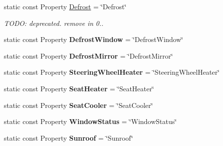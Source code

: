 \begin{DoxyCompactItemize}
\item 
\hypertarget{classVehicleProperty_a1f1ade6fb94a977e8dbc31b3a90b1cc3}{static const Property \hyperlink{classVehicleProperty_a1f1ade6fb94a977e8dbc31b3a90b1cc3}{Defrost} = \char`\"{}Defrost\char`\"{}}\label{classVehicleProperty_a1f1ade6fb94a977e8dbc31b3a90b1cc3}

\begin{DoxyCompactList}\small\item\em T\+O\+D\+O\+: deprecated. remove in 0.. \end{DoxyCompactList}\item 
\hypertarget{classVehicleProperty_a09d9a372040ca6ab43bb77e037fe0c26}{static const Property {\bfseries Defrost\+Window} = \char`\"{}Defrost\+Window\char`\"{}}\label{classVehicleProperty_a09d9a372040ca6ab43bb77e037fe0c26}

\item 
\hypertarget{classVehicleProperty_a08afe7a9d7dec0fcf7946a7d0715f27a}{static const Property {\bfseries Defrost\+Mirror} = \char`\"{}Defrost\+Mirror\char`\"{}}\label{classVehicleProperty_a08afe7a9d7dec0fcf7946a7d0715f27a}

\item 
\hypertarget{classVehicleProperty_a50ba22b48049e141acfd9c24549573c2}{static const Property {\bfseries Steering\+Wheel\+Heater} = \char`\"{}Steering\+Wheel\+Heater\char`\"{}}\label{classVehicleProperty_a50ba22b48049e141acfd9c24549573c2}

\item 
\hypertarget{classVehicleProperty_aaf891a6fb7485be67ab8dfae96636076}{static const Property {\bfseries Seat\+Heater} = \char`\"{}Seat\+Heater\char`\"{}}\label{classVehicleProperty_aaf891a6fb7485be67ab8dfae96636076}

\item 
\hypertarget{classVehicleProperty_aa5ccd72b6b86bd1741d05281fb0490c6}{static const Property {\bfseries Seat\+Cooler} = \char`\"{}Seat\+Cooler\char`\"{}}\label{classVehicleProperty_aa5ccd72b6b86bd1741d05281fb0490c6}

\item 
\hypertarget{classVehicleProperty_aafce44d9eb4eb200970bf1146cdd77d3}{static const Property {\bfseries Window\+Status} = \char`\"{}Window\+Status\char`\"{}}\label{classVehicleProperty_aafce44d9eb4eb200970bf1146cdd77d3}

\item 
\hypertarget{classVehicleProperty_ae7498970718f7bf52ef6a5800084b91b}{static const Property {\bfseries Sunroof} = \char`\"{}Sunroof\char`\"{}}\label{classVehicleProperty_ae7498970718f7bf52ef6a5800084b91b}


\end{DoxyCompactItemize}
